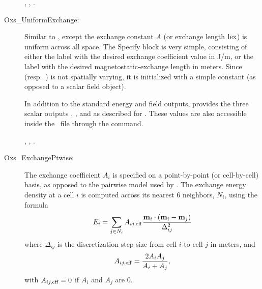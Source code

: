 \begin{description}
   \begin{ExampleMifs}
     , , .
   \end{ExampleMifs}

\item[Oxs\_UniformExchange:]
%
   Similar to , except the exchange constant $A$
   (or exchange length ${\rm lex}$) is uniform across all space.  The
   Specify block is very simple, consisting of either the label
    with the desired exchange coefficient value in J/m, or
   the label  with the desired magnetostatic-exchange
   length in meters.  Since  (resp.\ ) is not spatially
   varying, it is initialized with a simple constant (as opposed to a
   scalar field object).

   In addition to the standard energy and field outputs,
    provides the three scalar outputs
   , , and
    as described for .
   These values are also accessible inside the \MIF\ file through the
    command.

   \begin{ExampleMifs}
     , , .
   \end{ExampleMifs}

\item[Oxs\_ExchangePtwise:]
%
   The exchange coefficient $A_i$ is specified on
   a point-by-point (or cell-by-cell) basis, as opposed to the pairwise
   model used by .  The exchange
   energy density at a cell $i$ is computed across its nearest 6 neighbors,
   $N_i$, using the formula
   \begin{displaymath}
        E_i =  \sum_{j\in N_i} A_{ij,{\rm eff}}
         \frac{\textbf{m}_i\cdot\left(\textbf{m}_i - \textbf{m}_j\right)}{\Delta_{ij}^2}
   \end{displaymath}
   where $\Delta_{ij}$ is the discretization step size from cell $i$ to
   cell $j$ in meters, and
   \begin{displaymath}
         A_{ij,{\rm eff}} = \frac{2A_iA_j}{A_i+A_j},
   \end{displaymath}
   with $A_{ij,{\rm eff}} = 0$ if $A_i$ and $A_j$ are 0.


\end{description}
